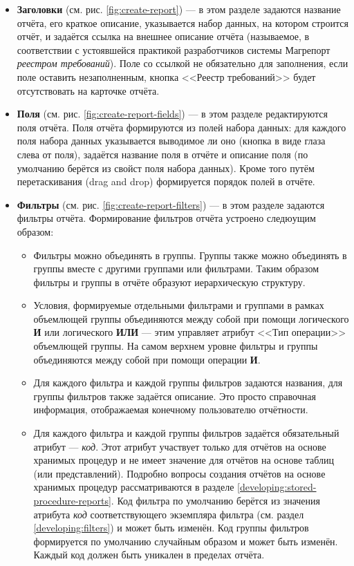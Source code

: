 \documentclass[../user-manual.tex]{subfiles}
\begin{document}
	\begin{itemize}
		\item \textbf{Заголовки} (см. рис. \ref{fig:create-report}) --- в этом разделе задаются название отчёта, его краткое описание, указывается набор данных, на котором строится отчёт, и задаётся ссылка на внешнее описание отчёта (называемое, в соответствии с устоявшейся практикой разработчиков системы Магрепорт \textit{реестром требований}). Поле со ссылкой не обязательно для заполнения, если поле оставить незаполненным, кнопка <<Реестр требований>> будет отсутствовать на карточке отчёта.
		
		\item \textbf{Поля} (см. рис. \ref{fig:create-report-fields}) --- в этом разделе редактируются поля отчёта. Поля отчёта формируются из полей набора данных: для каждого поля набора данных указывается выводимое ли оно (кнопка в виде глаза слева от поля), задаётся название поля в отчёте и описание поля (по умолчанию берётся из свойст поля набора данных). Кроме того путём перетаскивания (drag and drop) формируется порядок полей в отчёте.
		
		\item \textbf{Фильтры} (см. рис. \ref{fig:create-report-filters}) --- в этом разделе задаются фильтры отчёта. Формирование фильтров отчёта устроено следюущим образом:
			\begin{itemize}
				\item Фильтры можно объединять в группы. Группы также можно объединять в группы вместе с другими группами или фильтрами. Таким образом фильтры и группы в отчёте образуют иерархическую структуру.
				
				\item Условия, формируемые отдельными фильтрами и группами в рамках объемлющей группы объединяются между собой при помощи логического \textbf{И} или логического \textbf{ИЛИ} --- этим управляет атрибут <<Тип операции>> объемлющей группы. На самом верхнем уровне фильтры и группы объединяются между собой при помощи операции \textbf{И}.
				
				\item Для каждого фильтра и каждой группы фильтров задаются названия, для группы фильтров также задаётся описание. Это просто справочная информация, отображаемая конечному пользователю отчётности.
				
				\item Для каждого фильтра и каждой группы фильтров задаётся обязательный атрибут --- \textit{код}. Этот атрибут участвует только для отчётов на основе хранимых процедур и не имеет значение для отчётов на основе таблиц (или представлений). Подробно вопросы создания отчётов на основе хранимых процедур рассматриваются в разделе \ref{developing:stored-procedure-reports}. Код фильтра по умолчанию берётся из значения атрибута \textit{код} соответствующего экземпляра фильтра (см. раздел \ref{developing:filters}) и может быть изменён. Код группы фильтров формируется по умолчанию случайным образом и может быть изменён. Каждый код должен быть уникален в пределах отчёта.
				

\end{itemize}
\end{itemize}
\end{document}
